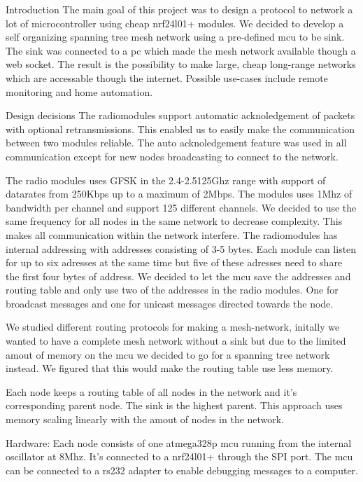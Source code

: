 Introduction
The main goal of this project was to design a protocol to network a lot of microcontroller using cheap nrf24l01+ modules.
We decided to develop a self organizing spanning tree mesh network using a pre-defined mcu to be sink. 
The sink was connected to a pc which made the mesh network available though a web socket.
The result is the possibility to make large, cheap long-range networks which are accessable though the internet. 
Possible use-cases include remote monitoring and  home automation. 

Design decisions
The radiomodules support automatic acknoledgement of packets with optional retransmissions. This enabled us to easily make the communication between two modules reliable. The auto acknoledgement feature was used in all communication except for new nodes broadcasting to connect to the network.

The radio modules uses GFSK in the 2.4-2.5125Ghz range with support of datarates from 250Kbps up to a maximum of 2Mbps. The modules uses 1Mhz of bandwidth per channel and support 125 different channels. We decided to use the same frequency for all nodes in the same network to decrease complexity. This makes all communication within the network interfere. 
The radiomodules has internal addressing with addresses consisting of 3-5 bytes. Each module can listen for up to six adresses at the same time but five of these adresses need to share the first four bytes of address. We decided to let the mcu save the addresses and routing table and only use two of the addresses in the radio modules. One for broadcast messages and one for unicast messages directed towards the node. 

We studied different routing protocols for making a mesh-network, initally we wanted to have a complete mesh network without a sink but due to the limited amout of memory on the mcu we decided to go for a spanning tree network instead. We figured that this would make the routing table use less memory.

Each node keeps a routing table of all nodes in the network and it's corresponding parent node. The sink is the highest parent. This approach uses memory scaling linearly with the amout of nodes in the network. 

Hardware:
Each node consists of one atmega328p mcu running from the internal oscillator at 8Mhz. It's connected to a nrf24l01+ through the SPI port. The mcu can be connected to a rs232 adapter to enable debugging messages to a computer. 
